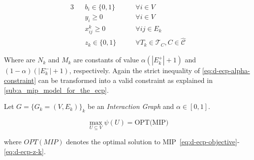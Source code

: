 \begin{alignat}{3}
	\label{eq:d-ecp-b-i}
	                                           &                                           & b _{i} \in \{0, 1\} \quad\quad                                                & \forall i \in V                           \\
	\label{eq:d-ecp-y-i}
	                                           &                                           & y _{i} \geq 0 \quad\quad                                                      & \forall i \in V                           \\
	\label{eq:d-ecp-x-ij}
	                                           &                                           & x _{ij} ^{k}  \geq 0 \quad\quad                                               & \forall ij \in E_k                        \\
	\label{eq:d-ecp-z-k}
	                                           &                                           & z _{k} \in \{0, 1\} \quad\quad                                                & \forall T_{k} \in \mathcal{T} _{C}, C \in
	\hat{\mathcal{C}}
\end{alignat}

Where are $N_k$ and $M_k$ are constants of value $\alpha (|E_k^{+}| + 1)$ and $(1 -
	\alpha ) ( |E^{-}_k| + 1)$, respectively.
Again the strict inequality of \eqref{eq:d-ecp-alpha-constraint} can be
transformed into a valid constraint as explained in
\autoref{sub:a_mip_model_for_the_ecp}.

\begin{theorem}
	\label{th:d-ecp-mip}
	Let $G = \{G_k = (V,E_k) \}_k$ be an \emph{Interaction Graph} and $\alpha \in
		[0, 1]$.

	\begin{equation}
		\max_{U \subseteq V} \psi(U) = \text{OPT(MIP)}
	\end{equation}

	where $OPT(MIP)$ denotes the optimal solution to
	MIP~\eqref{eq:d-ecp-objective}-\eqref{eq:d-ecp-z-k}.
\end{theorem}

